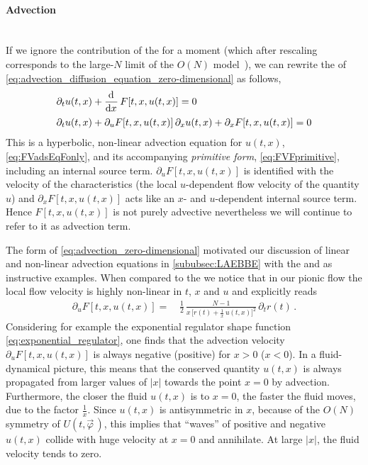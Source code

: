 \paragraph{Advection}\label{paragraph:conservative_form_advection}\mbox{}\\
If we ignore the contribution of the \sigmaMode{} for a moment (which \dash{} after rescaling \dash{} corresponds to the large-$N$ limit of the $O(N)$ model~\cite{Grossi:2019urj,Tetradis:1995br,Grossi:2021ksl,Steil:2021cbu}), we can rewrite the \lhs{} of \cref{eq:advection_diffusion_equation_zero-dimensional} as follows,
\begin{align}
	\partial_t u ( t, x )& + \dod{}{x} F [ t, x, u ( t, x ) ] =  0 \label{eq:advection_zero-dimensional} \\[.2em]
	\partial_t u ( t, x )& + \partial_u F [ t, x, u ( t, x ) ] \, \partial_x u ( t, x ) +\partial_x F [ t, x, u ( t, x ) ] = 0 \label{eq:advection_zero-dimensional_primitive}
\end{align}
This is a hyperbolic, non-linear advection equation for $u ( t, x )$, \cf{} \cref{eq:FVadsEqFonly}, and its accompanying \textit{primitive form}, \cf{} \cref{eq:FVFprimitive}, including an internal source term.
$\partial_u F [ t, x, u ( t, x ) ]$ is identified with the velocity of the characteristics (the local $u$-dependent flow velocity of the quantity $u$) and $\partial_x F [ t, x, u ( t, x ) ]$ acts like an $x$- and $u$-dependent internal source term.  
Hence $F [ t, x, u ( t, x ) ]$ is not purely advective nevertheless we will continue to refer to it as advection term.

The form of \cref{eq:advection_zero-dimensional} motivated our discussion of linear and non-linear advection equations in \cref{sububsec:LAEBBE} with the \laeq{} and \bbeq{} as instructive examples.
When compared to the \bbeq{} we notice that in our pionic \frg{} flow the local flow velocity is highly non-linear in $t$, $x$ and $u$ and explicitly reads
\begin{align}
	\partial_u F [ t, x, u ( t, x ) ] = \, & \frac{1}{2}\,\frac{ N - 1 }{x \, \big[ r ( t ) + \frac{1}{x} \, u ( t, x ) \big]^2}\,\partial_t r ( t ) \, .	\label{eq:advection_velocity}
\end{align}
Considering for example the exponential regulator shape function \eqref{eq:exponential_regulator}, one finds that the advection velocity $\partial_u F [ t, x, u ( t, x ) ]$ is always negative (positive) for $x > 0$ ($x < 0$).
In a fluid-dynamical picture, this means that the conserved quantity $u ( t, x )$ is always propagated from larger values of $|x|$ towards the point $x = 0$ by advection.
Furthermore, the closer the fluid $u ( t, x )$ is to $x = 0$, the faster the fluid moves, due to the factor $\frac{1}{x}$.
Since $u ( t, x )$ is antisymmetric in $x$, because of the $O(N)$ symmetry of $U ( t, \vec{\varphi} \, )$, this implies that ``waves'' of positive and negative $u ( t, x )$ collide with huge velocity at $x = 0$ and annihilate.
At large $|x|$, the fluid velocity tends to zero.

